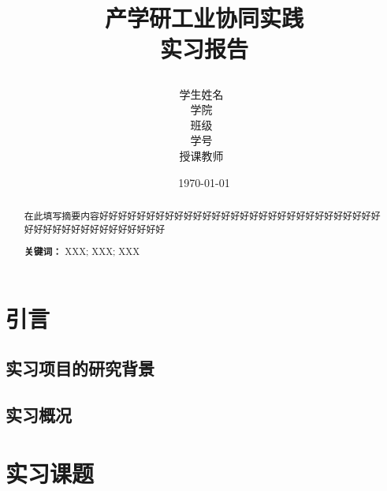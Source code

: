\documentclass[12pt,hyperref,a4paper,UTF8]{ctexart}
\title{ 
        \heiti \xiaochuhao \textbf{{产学研工业协同实践\\实习报告}} \par
        \vspace{1cm}
    }
\author{
        \vspace{0.5cm}
        \kaishu\Large 学生姓名\ \dlmu[9cm]{曾康慧} \qquad \\ %
        \vspace{0.5cm}
        \kaishu\Large 学\hspace{2em}院\ \dlmu[9cm]{未来技术学院} \qquad \\ %
        \vspace{0.5cm}
        \kaishu\Large 班\hspace{2em}级\ \dlmu[9cm]{220211} \\ %
        \vspace{0.5cm}
        \kaishu\Large 学\hspace{2em}号\ \dlmu[9cm]{20211003337} \\ %
        \vspace{0.5cm}
        \kaishu\Large 授课教师\ \dlmu[9cm]{陆承达} \qquad  \\ 
        \vspace{1cm}
    }
\date{\today} %
\begin{document}
\cover
\thispagestyle{empty} %

\newpage
\begin{abstract}
在此填写摘要内容好好好好好好好好好好好好好好好好好好好好好好好好好好好好好好好好好好好好好好好好好好好好好 


\vspace{1cm}
\textbf{关键词：} XXX; \hspace{0.5em} XXX; \hspace{0.5em} XXX
\end{abstract}
\thispagestyle{empty} %

\newpage
\tableofcontents
 \thispagestyle{empty} %

\newpage
\setcounter{page}{1} %




\section{引言}

\subsection{实习项目的研究背景}

\subsection{实习概况}



\section{实习课题}
\end{document}
